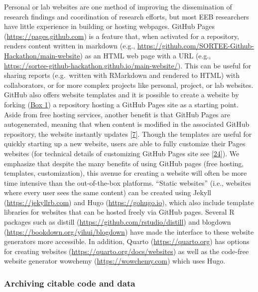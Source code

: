 Personal or lab websites are one method of improving the dissemination of research findings and coordination of research efforts, but most EEB researchers have little experience in building or hosting webpages.
GitHub Pages (\url{https://pages.github.com}) is a feature that, when activated for a repository, renders content written in markdown (e.g., \url{https://github.com/SORTEE-Github-Hackathon/main-website}) as an HTML web page with a URL (e.g., \url{https://sortee-github-hackathon.github.io/main-website/}).
This can be useful for sharing reports (e.g.~written with RMarkdown and rendered to HTML) with collaborators, or for more complex projects like personal, project, or lab websites.
GitHub also offers website templates and it is possible to create a website by forking (\protect\hyperlink{definitions}{Box 1}) a repository hosting a GitHub Pages site as a starting point.
Aside from free hosting services, another benefit is that GitHub Pages are autogenerated, meaning that when content is modified in the associated GitHub repository, the website instantly updates {[}\protect\hyperlink{ref-RVetqmsg}{7}{]}.
Though the templates are useful for quickly starting up a new website, users are able to fully customize their Pages websites (for technical details of customizing GitHub Pages site see {[}\protect\hyperlink{ref-MXxgZJ45}{24}{]}).
We emphasize that despite the many benefits of using GitHub pages (free hosting, templates, customization), this avenue for creating a website will often be more time intensive than the out-of-the-box platforms. ``Static websites'' (i.e., websites where every user sees the same content) can be created using Jekyll (\url{https://jekyllrb.com}) and Hugo (\url{https://gohugo.io}), which also include template libraries for websites that can be hosted freely via GitHub pages.
Several R packages such as distill (\url{https://github.com/rstudio/distill}) and blogdown (\url{https://bookdown.org/yihui/blogdown}) have made the interface to these website generators more accessible.
In addition, Quarto (\url{https://quarto.org}) has options for creating websites (\url{https://quarto.org/docs/websites}) as well as the code-free website generator wowchemy (\url{https://wowchemy.com}) which uses Hugo.

\hypertarget{archiving-citable-code-and-data}{%
\subsubsection{Archiving citable code and data}\label{archiving-citable-code-and-data}}

